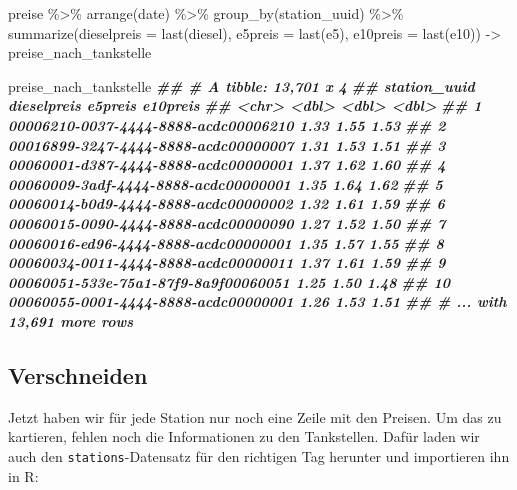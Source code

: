 \documentclass[11pt,german,a4paper]{article}
\newenvironment{Shaded}{\begin{snugshade}}{\end{snugshade}}
\newcommand{\AttributeTok}[1]{\textcolor[rgb]{0.77,0.63,0.00}{#1}}
\newcommand{\DocumentationTok}[1]{\textcolor[rgb]{0.56,0.35,0.01}{\textbf{\textit{#1}}}}
\newcommand{\FunctionTok}[1]{\textcolor[rgb]{0.00,0.00,0.00}{#1}}
\newcommand{\NormalTok}[1]{#1}
\newcommand{\OtherTok}[1]{\textcolor[rgb]{0.56,0.35,0.01}{#1}}
\newcommand{\SpecialCharTok}[1]{\textcolor[rgb]{0.00,0.00,0.00}{#1}}
\begin{document}
\begin{Shaded}
\begin{Highlighting}[]
\NormalTok{preise }\SpecialCharTok{\%\textgreater{}\%}
  \FunctionTok{arrange}\NormalTok{(date) }\SpecialCharTok{\%\textgreater{}\%}
  \FunctionTok{group\_by}\NormalTok{(station\_uuid) }\SpecialCharTok{\%\textgreater{}\%}
  \FunctionTok{summarize}\NormalTok{(}\AttributeTok{dieselpreis =} \FunctionTok{last}\NormalTok{(diesel),}
            \AttributeTok{e5preis     =} \FunctionTok{last}\NormalTok{(e5),}
            \AttributeTok{e10preis    =} \FunctionTok{last}\NormalTok{(e10)) }\OtherTok{{-}\textgreater{}}
\NormalTok{  preise\_nach\_tankstelle}

\NormalTok{preise\_nach\_tankstelle}
\DocumentationTok{\#\# \# A tibble: 13,701 x 4}
\DocumentationTok{\#\#    station\_uuid                         dieselpreis e5preis e10preis}
\DocumentationTok{\#\#    \textless{}chr\textgreater{}                                      \textless{}dbl\textgreater{}   \textless{}dbl\textgreater{}    \textless{}dbl\textgreater{}}
\DocumentationTok{\#\#  1 00006210{-}0037{-}4444{-}8888{-}acdc00006210        1.33    1.55     1.53}
\DocumentationTok{\#\#  2 00016899{-}3247{-}4444{-}8888{-}acdc00000007        1.31    1.53     1.51}
\DocumentationTok{\#\#  3 00060001{-}d387{-}4444{-}8888{-}acdc00000001        1.37    1.62     1.60}
\DocumentationTok{\#\#  4 00060009{-}3adf{-}4444{-}8888{-}acdc00000001        1.35    1.64     1.62}
\DocumentationTok{\#\#  5 00060014{-}b0d9{-}4444{-}8888{-}acdc00000002        1.32    1.61     1.59}
\DocumentationTok{\#\#  6 00060015{-}0090{-}4444{-}8888{-}acdc00000090        1.27    1.52     1.50}
\DocumentationTok{\#\#  7 00060016{-}ed96{-}4444{-}8888{-}acdc00000001        1.35    1.57     1.55}
\DocumentationTok{\#\#  8 00060034{-}0011{-}4444{-}8888{-}acdc00000011        1.37    1.61     1.59}
\DocumentationTok{\#\#  9 00060051{-}533e{-}75a1{-}87f9{-}8a9f00060051        1.25    1.50     1.48}
\DocumentationTok{\#\# 10 00060055{-}0001{-}4444{-}8888{-}acdc00000001        1.26    1.53     1.51}
\DocumentationTok{\#\# \# ... with 13,691 more rows}
\end{Highlighting}
\end{Shaded}

\hypertarget{verschneiden-1}{%
\subsection{Verschneiden}\label{verschneiden-1}}

Jetzt haben wir für jede Station nur noch eine Zeile mit den Preisen.
Um das zu kartieren, fehlen noch die Informationen zu den Tankstellen. Dafür laden wir auch den \texttt{stations}-Datensatz für den richtigen Tag herunter und importieren ihn in R:
\end{document}
